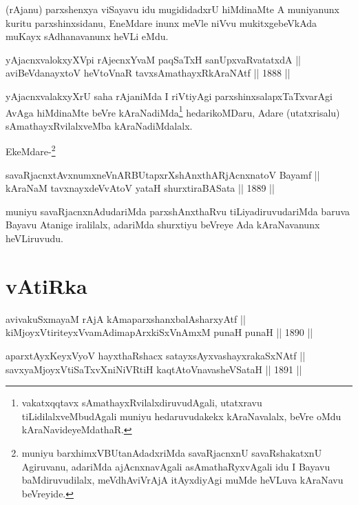 \begin{artha}
(rAjanu) parxshenxya viSayavu idu mugididadxrU hiMdinaMte
A muniyanunx kuritu parxshinxsidanu, EneMdare inunx meVle niVvu
mukitxgebeVkAda muKayx sAdhanavanunx heVLi eMdu.
\end{artha}

\begin{shl}
yAjacnxvalokxyXV\s pi rAjecnxYvaM paqSaTxH sanUpxvaRvatatxdA || \\
aviBeVdanayxtoV heVtoVnaR tavxsAmathayxRkAraNAtf ||  1888 ||  
\end{shl}

\begin{artha}
yAjacnxvalakxyXrU saha rAjaniMda I riVtiyAgi parxshinxsalapxTaTxvarAgi
AvAga hiMdinaMte beVre kAraNadiMda\footnote[3]{vakatxqqtavx
sAmathayxRvilalxdiruvudAgali, utatxravu tiLidilalxveMbudAgali muniyu
hedaruvudakekx kAraNavalalx, beVre oMdu kAraNavideyeMdathaR.} hedarikoMDaru, Adare
(utatxrisalu) sAmathayxRvilalxveMba kAraNadiMdalalx.

EkeMdare-\footnote[4]{muniyu barxhimxVBUtanAdadxriMda savaRjacnxnU
savaRshakatxnU Agiruvanu, adariMda ajAcnxnavAgali asAmathaRyxvAgali
idu I Bayavu baMdiruvudilalx, meVdhAviVrAjA itAyxdiyAgi muMde
heVLuva kAraNavu beVreyide.}
\end{artha}

\begin{shl}
savaRjacnxtAvxnumxneVnARBUtapxrXshAnxthARjAcnxnatoV Bayamf ||  \\
kAraNaM tavxnayxdeVvAtoV yataH shurxtiraBASata ||  1889 ||  
\end{shl}

\begin{artha}
muniyu savaRjacnxnAdudariMda parxshAnxthaRvu tiLiyadiruvudariMda
baruva Bayavu Atanige iralilalx, adariMda shurxtiyu beVreye Ada
kAraNavanunx heVLiruvudu.
\end{artha}

\section*{vAtiRka}

\begin{shl}
avivakuSxmayaM rAjA kAmaparxshanxbalAsharxyAtf || \\
kiMjoyxVtiriteyxVvamAdimapArxkiSxVnAmxM punaH punaH ||  1890 ||  
\end{shl}

\begin{shl}
aparxtAyxKeyxVyoV hayxthaRshacx satayxsAyxvashayxrakaSxNAtf || \\
savxyaMjoyxVtiSaTxvXniNiVRtiH kaqtA\s toV\s navasheVSataH ||  1891 ||  
\end{shl}

